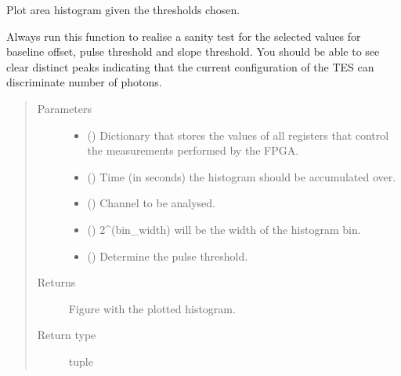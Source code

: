 \documentclass[letterpaper,10pt,english]{sphinxmanual}
\begin{document}
\begin{fulllineitems}
\label{\detokenize{tes:tes.mca_control.area_histogram}}
\sphinxAtStartPar
Plot area histogram given the thresholds chosen.

\sphinxAtStartPar
Always run this function to realise a sanity test for the selected
values for baseline offset, pulse threshold and slope
threshold.
You should be able to see clear distinct peaks indicating that
the current configuration of the TES can discriminate number of
photons.
\begin{quote}\begin{description}
\item[{Parameters}] \leavevmode\begin{itemize}
\item {} 
\sphinxAtStartPar
{} () \textendash{} Dictionary that stores the values of all registers that control
the measurements performed by the FPGA.

\item {} 
\sphinxAtStartPar
{} () \textendash{} Time (in seconds) the histogram should be accumulated over.

\item {} 
\sphinxAtStartPar
{} () \textendash{} Channel to be analysed.

\item {} 
\sphinxAtStartPar
{} () \textendash{} 2\textasciicircum{}(bin\_width) will be the width of the histogram bin.

\item {} 
\sphinxAtStartPar
{} () \textendash{} Determine the pulse threshold.

\end{itemize}

\item[{Returns}] \leavevmode
\sphinxAtStartPar
{} \textendash{} Figure with the plotted histogram.

\item[{Return type}] \leavevmode
\sphinxAtStartPar
tuple

\end{description}\end{quote}

\end{fulllineitems}
\end{document}
